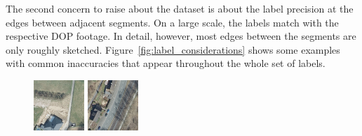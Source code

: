 The second concern to raise about the dataset is about the label precision at the edges between adjacent segments. On a large scale, the labels match with the respective DOP footage. In detail, however, most edges between the segments are only roughly sketched. Figure~\ref{fig:label_considerations} shows some examples with common inaccuracies that appear throughout the whole set of labels.

\begin{figure}
    \newcommand{\LabelConsiderationImageWidth}{0.17\textwidth}
    \centering
    \includegraphics[width=\LabelConsiderationImageWidth]{images/consideration_labels/44883}
    \hspace{1mm}
    \includegraphics[width=\LabelConsiderationImageWidth]{images/consideration_labels/150815}

\end{figure}
